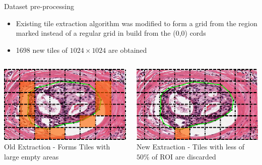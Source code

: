 \documentclass[usenames,dvipsnames]{beamer}
\begin{document}
\begin{frame}{Dataset pre-processing}

\begin{itemize}
    \item<1-> Existing tile extraction algorithm was modified to form a grid from the region marked instead of a regular grid in build from the (0,0) cords
    \item<2-> 1698 new tiles of $1024\times1024$ are obtained
\end{itemize}

\begin{columns}
\begin{column}{0.5\textwidth}
\includegraphics[width=\textwidth]{nuevoM/oldalgo.png}\\
\centering \small  Old Extraction - Forms Tiles with large empty areas
\end{column}
\begin{column}{0.5\textwidth}
\includegraphics[width=\textwidth]{nuevoM/newalgo.png}\\
\centering \small New Extraction - Tiles with less of $50\%$ of ROI are discarded
\end{column}
\end{columns}
    
\end{frame}
\end{document}
